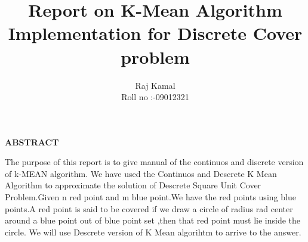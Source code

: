 \documentclass[a4paper,10pt]{report}
\title{Report on K-Mean Algorithm Implementation for Discrete Cover problem }
\author{Raj Kamal \\
        Roll no :-09012321}
\begin{document}
\maketitle

\begin{center}
{\Large{\bf{ABSTRACT}}}
\end{center}
The purpose of this report is to give manual of the continuos and discrete version of k-MEAN algorithm.
We have used the Continuos and Descrete K Mean Algorithm to approximate the solution of Descrete Square Unit Cover Problem.Given 
n red point and m blue point.We have the red points using blue points.A red point is said to be covered if we draw
a circle of radius rad center around a blue point out of blue point set ,then that red point must lie inside the circle.
We will use Descrete version of K Mean algorihtm to arrive to the answer.

\clearpage

\tableofcontents
\end{document}

